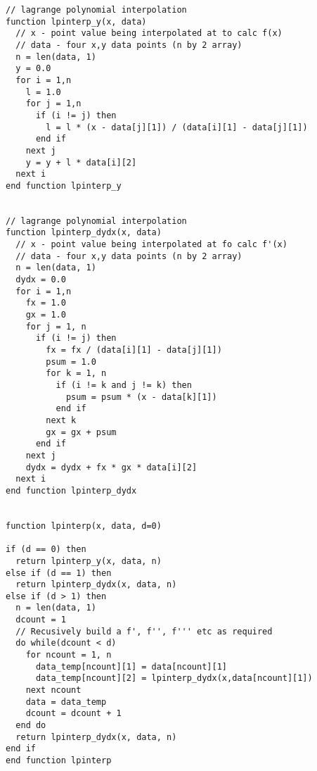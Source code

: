 \begin{lstlisting}[style=sPseudo,caption={Add two numbers function}]
// lagrange polynomial interpolation
function lpinterp_y(x, data)
  // x - point value being interpolated at to calc f(x)
  // data - four x,y data points (n by 2 array)
  n = len(data, 1)
  y = 0.0
  for i = 1,n
    l = 1.0
    for j = 1,n
      if (i != j) then
        l = l * (x - data[j][1]) / (data[i][1] - data[j][1])
      end if
    next j
    y = y + l * data[i][2]
  next i
end function lpinterp_y


// lagrange polynomial interpolation
function lpinterp_dydx(x, data)
  // x - point value being interpolated at fo calc f'(x)
  // data - four x,y data points (n by 2 array)
  n = len(data, 1)
  dydx = 0.0
  for i = 1,n
    fx = 1.0
    gx = 1.0
    for j = 1, n
      if (i != j) then
        fx = fx / (data[i][1] - data[j][1])
        psum = 1.0
        for k = 1, n
          if (i != k and j != k) then
            psum = psum * (x - data[k][1])
          end if
        next k
        gx = gx + psum
      end if
    next j
    dydx = dydx + fx * gx * data[i][2]
  next i
end function lpinterp_dydx


function lpinterp(x, data, d=0)

if (d == 0) then
  return lpinterp_y(x, data, n)
else if (d == 1) then
  return lpinterp_dydx(x, data, n)  
else if (d > 1) then
  n = len(data, 1)
  dcount = 1
  // Recusively build a f', f'', f''' etc as required
  do while(dcount < d) 
    for ncount = 1, n
      data_temp[ncount][1] = data[ncount][1]
      data_temp[ncount][2] = lpinterp_dydx(x,data[ncount][1])    
    next ncount
    data = data_temp
    dcount = dcount + 1
  end do
  return lpinterp_dydx(x, data, n)    
end if
end function lpinterp

\end{lstlisting}